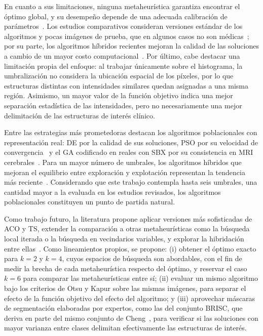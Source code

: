 \documentclass[letter, 10pt]{article}
\begin{document}
En cuanto a sus limitaciones, ninguna metaheur\'istica garantiza encontrar el \'optimo global, y su desempe\~no depende de una adecuada calibraci\'on de par\'ametros~\cite{Hammouche2010Comparative, Lameesa2024Role}.
Los estudios comparativos consideran versiones est\'andar de los algoritmos y pocas im\'agenes de prueba, que en algunos casos no son m\'edicas~\cite{Hammouche2010Comparative}; por su parte, los algoritmos h\'ibridos recientes mejoran la calidad de las soluciones a cambio de un mayor costo computacional~\cite{Lameesa2024Role}.
Por \'ultimo, cabe destacar una limitaci\'on propia del enfoque: al trabajar \'unicamente sobre el histograma, la umbralizaci\'on no considera la ubicaci\'on espacial de los p\'ixeles, por lo que estructuras distintas con intensidades similares quedan asignadas a una misma regi\'on.
Asimismo, un mayor valor de la funci\'on objetivo indica una mejor separaci\'on estad\'istica de las intensidades, pero no necesariamente una mejor delimitaci\'on de las estructuras de inter\'es cl\'inico.

Entre las estrategias m\'as prometedoras destacan los algoritmos poblacionales con representaci\'on real: DE por la calidad de sus soluciones, PSO por su velocidad de convergencia~\cite{Hammouche2010Comparative} y el GA codificado en reales con SBX por su consistencia en MRI cerebrales~\cite{Manikandan2014Multilevel}.
Para un mayor n\'umero de umbrales, los algoritmos h\'ibridos que mejoran el equilibrio entre exploraci\'on y explotaci\'on representan la tendencia m\'as reciente~\cite{Lameesa2024Role}.
Considerando que este trabajo contempla hasta seis umbrales, una cantidad mayor a la evaluada en los estudios revisados, los algoritmos poblacionales constituyen un punto de partida natural.

Como trabajo futuro, la literatura propone aplicar versiones m\'as sofisticadas de ACO y TS, extender la comparaci\'on a otras metaheur\'isticas como la b\'usqueda local iterada o la b\'usqueda en vecindarios variables, y explorar la hibridaci\'on entre ellas~\cite{Hammouche2010Comparative}.
Como lineamientos propios, se propone:
(i) obtener el \'optimo exacto para $k = 2$ y $k = 4$, cuyos espacios de b\'usqueda son abordables, con el fin de medir la brecha de cada metaheur\'istica respecto del \'optimo, y reservar el caso $k = 6$ para comparar las metaheur\'isticas entre s\'i;
(ii) evaluar un mismo algoritmo bajo los criterios de Otsu y Kapur sobre las mismas im\'agenes, para separar el efecto de la funci\'on objetivo del efecto del algoritmo; y
(iii) aprovechar m\'ascaras de segmentaci\'on elaboradas por expertos, como las del conjunto BRISC, que deriva en parte del mismo conjunto de Cheng~\cite{Fateh2026BRISC}, para verificar si las soluciones con mayor varianza entre clases delimitan efectivamente las estructuras de inter\'es.
\end{document}
